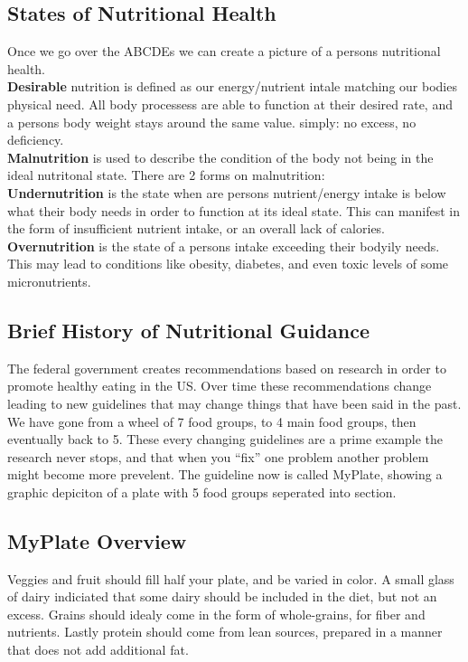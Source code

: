 \documentclass[letterpaper, 11pt]{article}
\begin{document}
\subsection{States of Nutritional Health}
\label{sec:orga80e1d4}
Once we go over the ABCDEs we can create a picture of a persons nutritional health.\\
\textbf{Desirable} nutrition is defined as our energy/nutrient intale matching our bodies physical need. All body processess are able to function at their desired rate, and a persons body weight stays around the same value. simply: no excess, no deficiency.\\
\textbf{Malnutrition} is used to describe the condition of the body not being in the ideal nutritonal state. There are 2 forms on malnutrition:\\
\textbf{Undernutrition} is the state when are persons nutrient/energy intake is below what their body needs in order to function at its ideal state. This can manifest in the form of insufficient nutrient intake, or an overall lack of calories.\\
\textbf{Overnutrition} is the state of a persons intake exceeding their bodyily needs. This may lead to conditions like obesity, diabetes, and even toxic levels of some micronutrients.\\
\subsection{Brief History of Nutritional Guidance}
\label{sec:org0172377}
The federal government creates recommendations based on research in order to promote healthy eating in the US. Over time these recommendations change leading to new guidelines that may change things that have been said in the past. We have gone from a wheel of 7 food groups, to 4 main food groups, then eventually back to 5. These every changing guidelines are a prime example the research never stops, and that when you ``fix'' one problem another problem might become more prevelent. The guideline now is called MyPlate, showing a graphic depiciton of a plate with 5 food groups seperated into section.\\
\subsection{MyPlate Overview}
\label{sec:org847ef16}
Veggies and fruit should fill half your plate, and be varied in color. A small glass of dairy indiciated that some dairy should be included in the diet, but not an excess. Grains should idealy come in the form of whole-grains, for fiber and nutrients. Lastly protein should come from lean sources, prepared in a manner that does not add additional fat.\\
\end{document}
